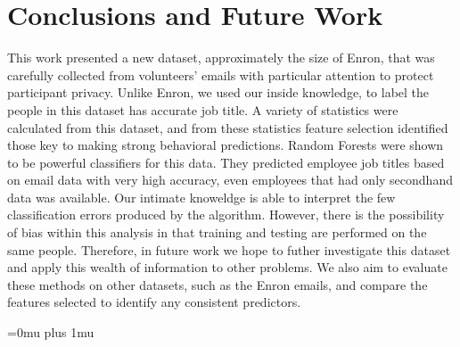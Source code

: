 \documentclass{article}
\begin{document}
\section{Conclusions and Future Work} \label{Conclusions}
This work presented a new dataset, approximately the size of Enron, that was carefully collected from volunteers' emails with particular attention to protect participant privacy.  Unlike Enron, we used our inside knowledge, to label the people in this dataset has accurate job title.  A variety of statistics were calculated from this dataset, and from these statistics feature selection identified those key to making strong behavioral predictions.  Random Forests were shown to be powerful classifiers for this data.  They predicted employee job titles based on email data with very high accuracy, even employees that had only secondhand data was available.  Our intimate knoweldge is able to interpret the few classification errors produced by the algorithm.  However, there is the possibility of bias within this analysis in that training and testing are performed on the same people.  Therefore, in future work we hope to futher investigate this dataset and apply this wealth of information to other problems.  We also aim to evaluate these methods on other datasets, such as the Enron emails, and compare the features selected to identify any consistent predictors.


\clearpage
\Urlmuskip=0mu plus 1mu\relax


\end{document}
